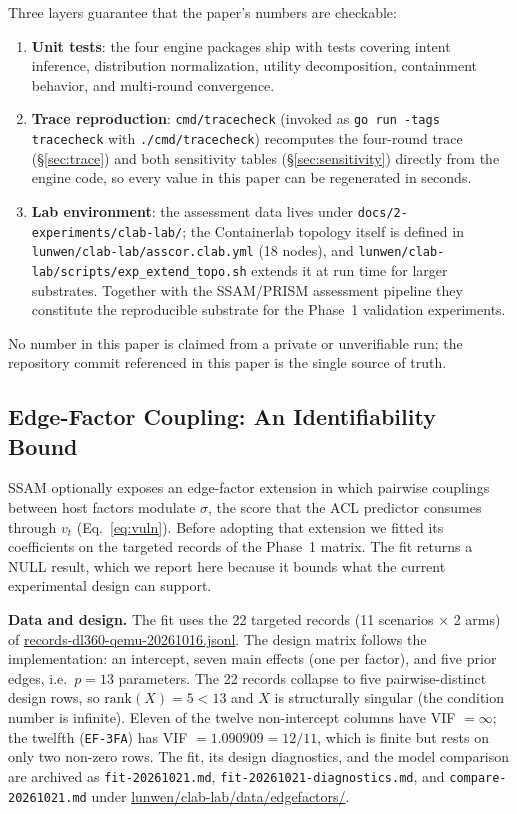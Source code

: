 \documentclass[11pt]{article}
\begin{document}
Three layers guarantee that the paper's numbers are checkable:
\begin{enumerate}
\item \textbf{Unit tests}: the four engine packages ship with tests covering
      intent inference, distribution normalization, utility decomposition,
      containment behavior, and multi-round convergence.
\item \textbf{Trace reproduction}: \texttt{cmd/tracecheck} (invoked as
      \texttt{go run -tags tracecheck} with \texttt{./cmd/tracecheck})
      recomputes the four-round trace (\S\ref{sec:trace}) and both sensitivity tables
      (\S\ref{sec:sensitivity}) directly from the engine code, so every
      value in this paper can be regenerated in seconds.
\item \textbf{Lab environment}: the assessment data lives under
      \texttt{docs/2-experiments/clab-lab/}; the Containerlab topology itself
      is defined in \texttt{lunwen/clab-lab/asscor.clab.yml} (18 nodes), and
      \texttt{lunwen/clab-lab/scripts/exp\_extend\_topo.sh} extends it at run
      time for larger substrates. Together with the SSAM/PRISM assessment
      pipeline they constitute the reproducible substrate for the Phase~1
      validation experiments.
\end{enumerate}
No number in this paper is claimed from a private or unverifiable run; the
repository commit referenced in this paper is the single source of truth.

\subsection{Edge-Factor Coupling: An Identifiability Bound}
\label{sec:edge-null}

SSAM optionally exposes an edge-factor extension in which pairwise couplings
between host factors modulate $\sigma$, the score that the ACL predictor
consumes through $v_t$ (Eq.~\ref{eq:vuln}). Before adopting that extension we
fitted its coefficients on the targeted records of the Phase~1 matrix. The
fit returns a NULL result, which we report here because it bounds what the
current experimental design can support.

\textbf{Data and design.} The fit uses the 22 targeted records (11 scenarios
$\times$ 2 arms) of
\url{records-dl360-qemu-20261016.jsonl}. The design matrix follows the
implementation: an intercept, seven main effects (one per factor), and five
prior edges, i.e.\ $p=13$ parameters. The 22 records collapse to five
pairwise-distinct design rows, so $\mathrm{rank}(X)=5<13$ and $X$ is
structurally singular (the condition number is infinite). Eleven of the
twelve non-intercept columns have VIF $=\infty$; the twelfth
(\texttt{EF-3FA}) has VIF $=1.090909=12/11$, which is finite but rests on
only two non-zero rows. The fit, its design diagnostics, and the model
comparison are archived as \texttt{fit-20261021.md},
\texttt{fit-20261021-diagnostics.md}, and \texttt{compare-20261021.md} under
\url{lunwen/clab-lab/data/edgefactors/}.
\end{document}
